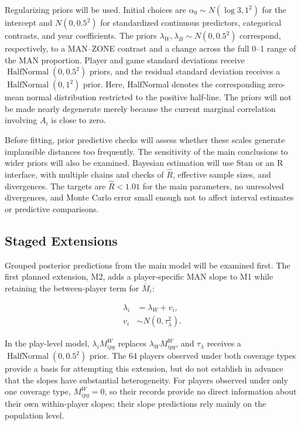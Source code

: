 \documentclass[a4paper,11pt]{article}
\begin{document}
Regularizing priors will be used. Initial choices are $\alpha_0\sim N(\log 3,1^2)$ for the intercept and $N(0,0.5^2)$ for standardized continuous predictors, categorical contrasts, and year coefficients. The priors $\lambda_W,\lambda_B\sim N(0,0.5^2)$ correspond, respectively, to a MAN--ZONE contrast and a change across the full 0--1 range of the MAN proportion. Player and game standard deviations receive $\operatorname{HalfNormal}(0,0.5^2)$ priors, and the residual standard deviation receives a $\operatorname{HalfNormal}(0,1^2)$ prior. Here, HalfNormal denotes the corresponding zero-mean normal distribution restricted to the positive half-line. The priors will not be made nearly degenerate merely because the current marginal correlation involving $A_i$ is close to zero.

Before fitting, prior predictive checks will assess whether these scales generate implausible distances too frequently. The sensitivity of the main conclusions to wider priors will also be examined. Bayesian estimation will use Stan or an R interface, with multiple chains and checks of $\widehat R$, effective sample sizes, and divergences. The targets are $\widehat R<1.01$ for the main parameters, no unresolved divergences, and Monte Carlo error small enough not to affect interval estimates or predictive comparisons.

\subsection{Staged Extensions}

Grouped posterior predictions from the main model will be examined first. The first planned extension, M2, adds a player-specific MAN slope to M1 while retaining the between-player term for $\bar M_i$:

\begin{equation}
\begin{aligned}
\lambda_i&=\lambda_W+v_i, \\
v_i&\sim N(0,\tau_{\lambda}^2).
\end{aligned}
\end{equation}

In the play-level model, $\lambda_iM^W_{ipg}$ replaces $\lambda_WM^W_{ipg}$, and $\tau_\lambda$ receives a $\operatorname{HalfNormal}(0,0.5^2)$ prior. The 64 players observed under both coverage types provide a basis for attempting this extension, but do not establish in advance that the slopes have substantial heterogeneity. For players observed under only one coverage type, $M^W_{ipg}=0$, so their records provide no direct information about their own within-player slopes; their slope predictions rely mainly on the population level.
\end{document}

